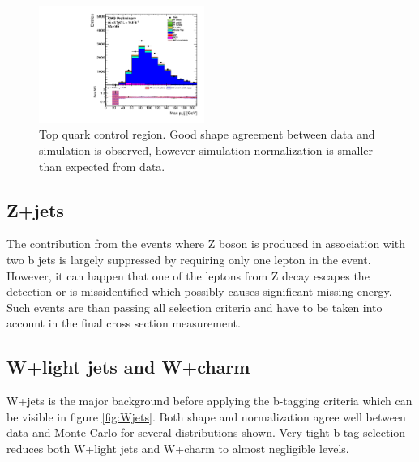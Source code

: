 \begin{figure}[htbp]
		\includegraphics[width=0.48\textwidth]{Figures/Results/Muon/prefit/TT_max_hJet_pt_doQCD1.pdf}		
	\caption[Top quark control region]{Top quark control region. Good shape agreement between data and simulation is observed, however simulation normalization is smaller than expected from data.}
	\label{fig:TT_CR}
\end{figure}

\subsection{Z+jets}

The contribution from the events where Z boson is produced in association with two b jets is largely suppressed by requiring only one lepton in the event. However, it can happen that one of the leptons from Z decay escapes the detection or is missidentified which possibly causes significant missing energy. Such events are than passing all selection criteria and have to be taken into account in the final cross section measurement. 

\subsection{W+light jets and W+charm}

W+jets is the major background before applying the b-tagging criteria which can be visible in figure \ref{fig:Wjets}. Both shape and normalization agree well between data and Monte Carlo for several distributions shown. Very tight b-tag selection reduces both W+light jets and W+charm to almost negligible levels.  

